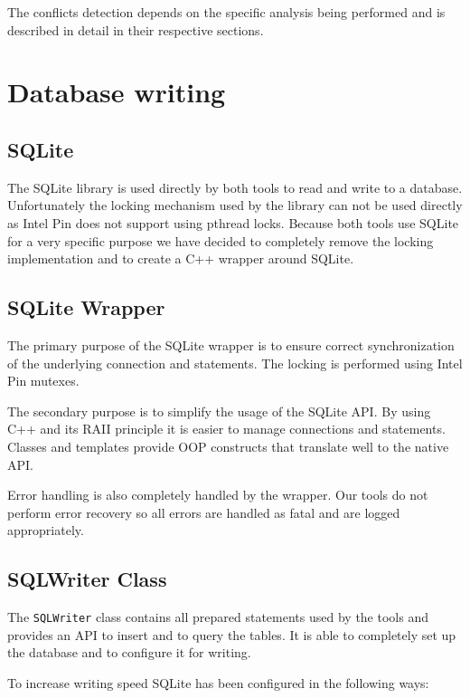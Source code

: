 The conflicts detection depends on the specific analysis being performed and is described in detail in their respective sections.

\section{Database writing}

\subsection{SQLite}

The SQLite library \cite{sqlitedoc} is used directly by both tools to read and write to a database. Unfortunately the locking mechanism used by the library can not be used directly as Intel Pin does not support using pthread locks. Because both tools use SQLite for a very specific purpose  we have decided to completely remove the locking implementation and to create a C++ wrapper around SQLite.

\subsection{SQLite Wrapper}

The primary purpose of the SQLite wrapper is to ensure correct synchronization of the underlying connection and statements. The locking is performed using Intel Pin mutexes.

The secondary purpose is to simplify the usage of the SQLite API. By using C++ and its RAII principle it is easier to manage connections and statements. Classes and templates provide OOP constructs that translate well to the native API.

Error handling is also completely handled by the wrapper. Our tools do not perform error recovery so all errors are handled as fatal and are logged appropriately. 

\subsection{SQLWriter Class}
\label{sqlwriter}

The \texttt{SQLWriter} class contains all prepared statements used by the tools and provides an API to insert and to query the tables. It is able to completely set up the database and to configure it for writing.

To increase writing speed SQLite has been configured in the following ways:

